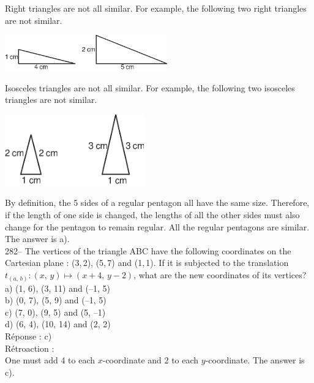 \documentclass[letterpaper, 12pt]{article}
\begin{document}
Right triangles are not all similar. For example, the following two
right triangles are not similar.
    \begin{center}
    \includegraphics[width=7cm]{trianglesemblable.eps}
    \end{center}

Isosceles triangles are not all similar. For example, the following
two isosceles triangles are not similar.
    \begin{center}
    \includegraphics[width=6cm]{trianglesemblable1.eps}
    \end{center}
By definition, the 5 sides of a regular pentagon all have the same
size. Therefore, if the length of one side is changed, the lengths
of all the other sides must also change for the pentagon to remain
regular.
All the regular pentagons are similar.\\
The answer is a).\\



282-- The vertices of the triangle ABC have the following
coordinates on the Cartesian plane : (3,\,2), (5,\,7) and (1,\,1).
If it is subjected to the translation $t_{\left( a,\,b\right) }
:\left( x,\,y\right) \longmapsto \left(x+4,\,y-2\right) $, what are
the new
coordinates of its vertices?\\

a) (1, 6), (3, 11) and (--1, 5)\\
b) (0, 7), (5, 9) and (--1, 5)\\
c) (7, 0), (9, 5) and (5, --1)\\
d) (6, 4), (10, 14) and (2, 2)\\

R\'eponse : c)\\

R\'etroaction : \\
One must add 4 to each $x$-coordinate and 2 to each $y$-coordinate.
The answer is c).\\
\end{document}
